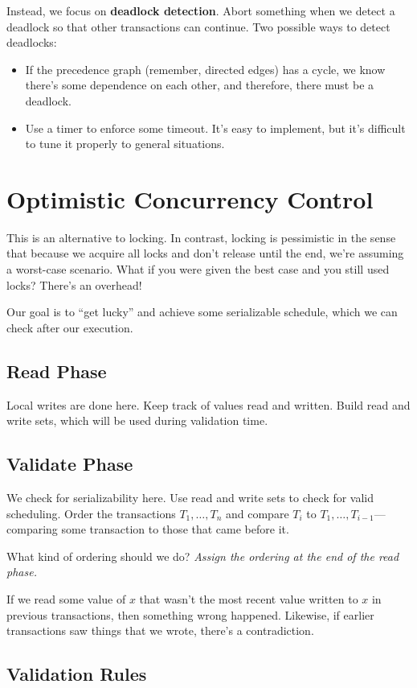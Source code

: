 \documentclass{article}
\begin{document}
Instead, we focus on \textbf{deadlock detection}. Abort something when we detect a deadlock so that other transactions can continue. Two possible ways to detect deadlocks:
\begin{itemize}
    \item If the precedence graph (remember, directed edges) has a cycle, we know there's some dependence on each other, and therefore, there must be a deadlock.
    \item Use a timer to enforce some timeout. It's easy to implement, but it's difficult to tune it properly to general situations.
\end{itemize}

\section{Optimistic Concurrency Control}
This is an alternative to locking. In contrast, locking is pessimistic in the sense that because we acquire all locks and don't release until the end, we're assuming a worst-case scenario. What if you were given the best case and you still used locks? There's an overhead!

Our goal is to ``get lucky'' and achieve some serializable schedule, which we can check after our execution.

\subsection*{Read Phase}
Local writes are done here. Keep track of values read and written. Build read and write sets, which will be used during validation time.

\subsection*{Validate Phase}
We check for serializability here. Use read and write sets to check for valid scheduling. Order the transactions $T_1,\ldots,T_n$ and compare $T_i$ to $T_1,\ldots,T_{i-1}$---comparing some transaction to those that came before it.

What kind of ordering should we do? \emph{Assign the ordering at the end of the read phase.}

If we read some value of $x$ that wasn't the most recent value written to $x$ in previous transactions, then something wrong happened. Likewise, if earlier transactions saw things that we wrote, there's a contradiction.

\subsection*{Validation Rules}
\end{document}
